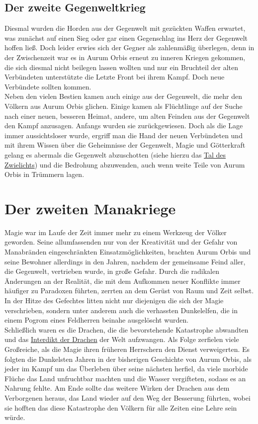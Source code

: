 \documentclass[a4paper,12pt,oneside]{book}
\begin{document}
\subsection{Der zweite Gegenweltkrieg}
Diesmal wurden die Horden aus der Gegenwelt mit gezückten Waffen erwartet, was zunächst auf einen Sieg oder gar einen Gegenschlag ins Herz der Gegenwelt hoffen ließ. Doch leider erwies sich der Gegner als zahlenmäßig überlegen, denn in der Zwischenzeit war es in Aurum Orbis erneut zu inneren Kriegen gekommen, die sich diesmal nicht beilegen lassen wollten und nur ein Bruchteil der alten Verbündeten unterstützte die Letzte Front bei ihrem Kampf. Doch neue Verbündete sollten kommen. 
\\Neben den vielen Bestien kamen auch einige aus der Gegenwelt, die mehr den Völkern aus Aurum Orbis glichen. Einige kamen als Flüchtlinge auf der Suche nach einer neuen, besseren Heimat, andere, um alten Feinden aus der Gegenwelt den Kampf anzusagen. Anfangs wurden sie zurückgewiesen. Doch als die Lage immer aussichtsloser wurde, ergriff man die Hand der neuen Verbündeten und mit ihrem Wissen über die Geheimnisse der Gegenwelt, Magie und Götterkraft gelang es abermals die Gegenwelt abzuschotten (siehe hierzu das \hyperref[Tal des Zwielichts]{Tal des Zwielichts}) und die Bedrohung abzuwenden, auch wenn weite Teile von Aurum Orbis in Trümmern lagen. 

\section{Der zweiten Manakriege}
Magie war im Laufe der Zeit immer mehr zu einem Werkzeug der Völker geworden. Seine allumfassenden nur von der Kreativität und der Gefahr von Manabränden eingeschränkten Einsatzmöglichkeiten, brachten Aurum Orbis und seine Bewohner allerdings in den Jahren, nachdem der gemeinsame Feind aller, die Gegenwelt, vertrieben wurde, in große Gefahr. Durch die radikalen Änderungen an der Realität, die mit dem Aufkommen neuer Konflikte immer häufiger zu Paradoxen führten, zerrten an dem Gerüst von Raum und Zeit selbst. In der Hitze des Gefechtes litten nicht nur diejenigen die sich der Magie verschrieben, sondern unter anderem auch die verhassten Dunkelelfen, die in einem Pogrom eines Feldherren beinahe ausgelöscht wurden.
\\Schließlich waren es die Drachen, die die bevorstehende Katastrophe abwandten und das \uline{Interdikt der Drachen} der Welt aufzwangen. Als Folge zerfielen viele Großreiche, als die Magie ihren früheren Herrschern den Dienst verweigerten. Es folgten die Dunkelsten Jahren in der bisherigen Geschichte von Aurum Orbis, als jeder im Kampf um das Überleben über seine nächsten herfiel, da viele morbide Flüche das Land unfruchtbar machten und die Wasser vergifteten, sodass es an Nahrung fehlte. Am Ende sollte das weitere Wirken der Drachen aus dem Verborgenen heraus, das Land wieder auf den Weg der Besserung führten, wobei sie hofften das diese Katastrophe den Völkern für alle Zeiten eine Lehre sein würde.
\end{document}
